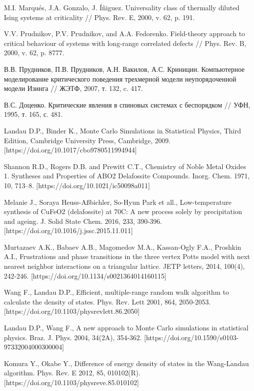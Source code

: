 \begin{thebibliography}{111}
M.I. Marqués, J.A. Gonzalo, J. Íñiguez. Universality class of thermally diluted Ising systems at criticality // Phys. Rev. E, 2000, v. 62, p. 191.

V.V. Prudnikov, P.V. Prudnikov, and A.A. Fedorenko. Field-theory approach to critical behaviour of systems with long-range correlated defects // Phys. Rev. B, 2000, v. 62, p. 8777.

В.В. Прудников, П.В. Прудников, А.Н. Вакилов, А.С. Криницин. Компьютерное моделирование критического поведения трехмерной модели неупорядоченной модели Изинга // ЖЭТФ, 2007, т. 132, c. 417.

В.С. Доценко. Критические явления в спиновых системах с беспорядком // УФН, 1995, т. 165, с. 481.








Landau D.P., Binder K., Monte Carlo Simulations in Statistical Physics, Third Edition, Cambridge University Press, Cambridge, 2009. [https://doi.org/10.1017/cbo9780511994944]

Shannon R.D., Rogers D.B. and Prewitt C.T., Chemistry of Noble Metal Oxides 1. Syntheses and Properties of ABO2 Delafossite Compounds. Inorg. Chem. 1971, 10, 713–8. [https://doi.org/10.1021/ic50098a011]

Melanie J., Soraya Heuss-Aßbichler, So-Hyun Park et all., Low-temperature synthesis of CuFeO2 (delafossite) at 70C: A new process solely by precipitation and ageing. J. Solid State Chem. 2016, 233, 390-396. [https://doi.org/10.1016/j.jssc.2015.11.011]

Murtazaev A.K., Babaev A.B., Magomedov M.A., Kassan-Ogly F.A., Proshkin A.I., Frustrations and phase transitions in the three vertex Potts model with next nearest neighbor interactions on a triangular lattice. JETP letters, 2014, 100(4), 242-246. [https://doi.org/10.1134/s0021364014160115]

Wang F., Landau D.P., Efficient, multiple-range random walk algorithm to calculate the density of states. Phys. Rev. Lett 2001, 864, 2050-2053. [https://doi.org/10.1103/physrevlett.86.2050]

Landau D.P., Wang F., A new approach to Monte Carlo simulations in statistical physics. Braz. J. Phys. 2004, 34(2A), 354-362. [https://doi.org/10.1590/s0103-97332004000300004]

Komura Y., Okabe Y., Difference of energy density of states in the Wang-Landau algorithm. Phys. Rev. E 2012, 85, 010102(R). [https://doi.org/10.1103/physreve.85.010102]











\end{thebibliography}
